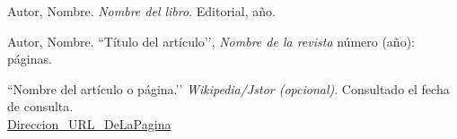 \documentclass[spanish,twoside,utf8]{book}
\begin{document}









\begin{thebibliography}{3}

Autor, Nombre.
\textit{Nombre del libro}.
Editorial, año. 

Autor, Nombre.
``Título del artículo’’,
\textit{Nombre de la revista} número (año):
páginas.

``Nombre del artículo o página.’’
\textit{Wikipedia/Jstor (opcional)}.
Consultado el fecha de consulta.\\
\url{Direccion\_URL\_DeLaPagina}

\end{thebibliography}











\end{document}
